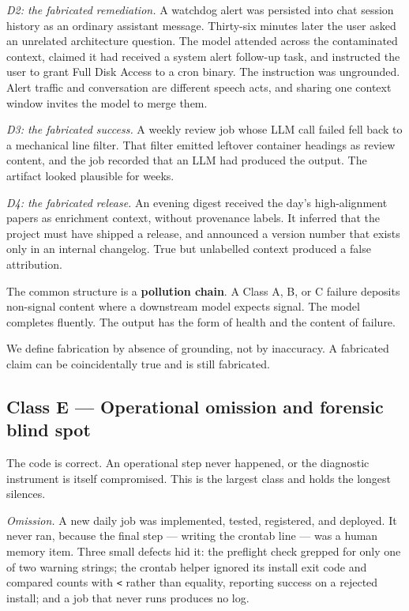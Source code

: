 \documentclass[conference]{IEEEtran}
\begin{document}
\emph{D2: the fabricated remediation.} A watchdog alert was persisted into
chat session history as an ordinary assistant message. Thirty-six minutes
later the user asked an unrelated architecture question. The model attended
across the contaminated context, claimed it had received a system alert
follow-up task, and instructed the user to grant Full Disk Access to a cron
binary. The instruction was ungrounded. Alert traffic and conversation are
different speech acts, and sharing one context window invites the model to
merge them.

\emph{D3: the fabricated success.} A weekly review job whose LLM call failed
fell back to a mechanical line filter. That filter emitted leftover
container headings as review content, and the job recorded that an LLM had
produced the output. The artifact looked plausible for weeks.

\emph{D4: the fabricated release.} An evening digest received the day's
high-alignment papers as enrichment context, without provenance labels. It
inferred that the project must have shipped a release, and announced a
version number that exists only in an internal changelog. True but
unlabelled context produced a false attribution.

The common structure is a \textbf{pollution chain}. A Class A, B, or C
failure deposits non-signal content where a downstream model expects signal.
The model completes fluently. The output has the form of health and the
content of failure.

We define fabrication by absence of grounding, not by inaccuracy. A
fabricated claim can be coincidentally true and is still fabricated.

\subsection{Class E --- Operational omission and forensic blind spot}

The code is correct. An operational step never happened, or the diagnostic
instrument is itself compromised. This is the largest class and holds the
longest silences.

\emph{Omission.} A new daily job was implemented, tested, registered, and
deployed. It never ran, because the final step --- writing the crontab line
--- was a human memory item. Three small defects hid it: the preflight check
grepped for only one of two warning strings; the crontab helper ignored its
install exit code and compared counts with \texttt{<} rather than equality,
reporting success on a rejected install; and a job that never runs produces
no log.
\end{document}
